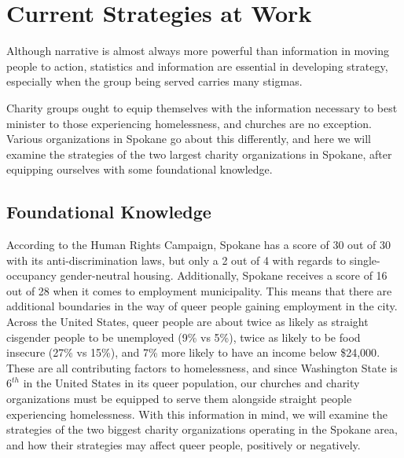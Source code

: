 
\section{Current Strategies at Work}

    Although narrative is almost always more powerful than information in moving people to action, statistics and information are essential in developing strategy, especially when the group being served carries many stigmas. 

    Charity groups ought to equip themselves with the information necessary to best minister to those experiencing homelessness, and churches are no exception.
    Various organizations in Spokane go about this differently, and here we will examine the strategies of the two largest charity organizations in Spokane, after equipping ourselves with some foundational knowledge.

    \subsection{Foundational Knowledge}
        According to the Human Rights Campaign, Spokane has a score of 30 out of 30 with its anti-discrimination laws, but only a 2 out of 4 with regards to single-occupancy gender-neutral housing\cite{hrc}.
        Additionally, Spokane receives a score of 16 out of 28 when it comes to employment municipality.
        This means that there are additional boundaries in the way of queer people gaining employment in the city.
        Across the United States, queer people are about twice as likely as straight cisgender people to be unemployed (9\% vs 5\%), twice as likely to be food insecure (27\% vs 15\%), and 7\% more likely to have an income below \$24,000\cite{hrc}.
        These are all contributing factors to homelessness, and since Washington State is $6^{th}$ in the United States in its queer population, our churches and charity organizations must be equipped to serve them alongside straight people experiencing homelessness.
        With this information in mind, we will examine the strategies of the two biggest charity organizations operating in the Spokane area, and how their strategies may affect queer people, positively or negatively.

